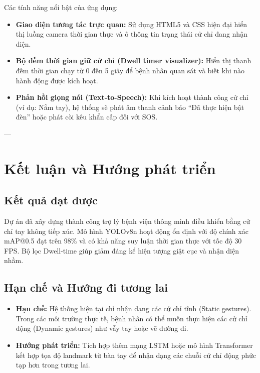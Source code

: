 \documentclass[12pt,a4paper]{article}
\begin{document}
Các tính năng nổi bật của ứng dụng:
\begin{itemize}
    \item \textbf{Giao diện tương tác trực quan:} Sử dụng HTML5 và CSS hiện đại hiển thị luồng camera thời gian thực và ô thông tin trạng thái cử chỉ đang nhận diện.
    \item \textbf{Bộ đếm thời gian giữ cử chỉ (Dwell timer visualizer):} Hiển thị thanh đếm thời gian chạy từ 0 đến 5 giây để bệnh nhân quan sát và biết khi nào hành động được kích hoạt.
    \item \textbf{Phản hồi giọng nói (Text-to-Speech):} Khi kích hoạt thành công cử chỉ (ví dụ: Nắm tay), hệ thống sẽ phát âm thanh cảnh báo ``Đã thực hiện bật đèn'' hoặc phát còi kêu khẩn cấp đối với SOS.
\end{itemize}

---

\section{Kết luận và Hướng phát triển}
\subsection{Kết quả đạt được}
Dự án đã xây dựng thành công trợ lý bệnh viện thông minh điều khiển bằng cử chỉ tay không tiếp xúc. Mô hình YOLOv8n hoạt động ổn định với độ chính xác mAP@0.5 đạt trên 98\% và có khả năng suy luận thời gian thực với tốc độ 30 FPS. Bộ lọc Dwell-time giúp giảm đáng kể hiện tượng giật cục và nhận diện nhầm.

\subsection{Hạn chế và Hướng đi tương lai}
\begin{itemize}
    \item \textbf{Hạn chế:} Hệ thống hiện tại chỉ nhận dạng các cử chỉ tĩnh (Static gestures). Trong các môi trường thực tế, bệnh nhân có thể muốn thực hiện các cử chỉ động (Dynamic gestures) như vẫy tay hoặc vẽ đường đi.
    \item \textbf{Hướng phát triển:} Tích hợp thêm mạng LSTM hoặc mô hình Transformer kết hợp tọa độ landmark từ bàn tay để nhận dạng các chuỗi cử chỉ động phức tạp hơn trong tương lai.
\end{itemize}
\end{document}
